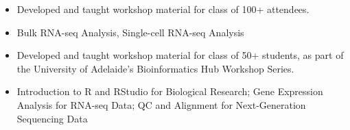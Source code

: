 \documentclass[10pt,a4paper,ragged2e,withhyper]{altacv2}
\begin{document}
\begin{paracol}{2}


\newpage


\begin{itemize}
\item Developed and taught workshop material for class of 100+ attendees. 
\item {} Bulk RNA-seq Analysis, Single-cell RNA-seq Analysis
\end{itemize}
\divider
{}
\begin{itemize}
\item Developed and taught workshop material for class of 50+ students, as part of the University of Adelaide's Bioinformatics Hub Workshop Series.
\item {} Introduction to R and RStudio for Biological Research; Gene Expression Analysis for RNA-seq Data; QC and Alignment for Next-Generation Sequencing Data
\end{itemize}




\switchcolumn



\end{paracol}
\end{document}
